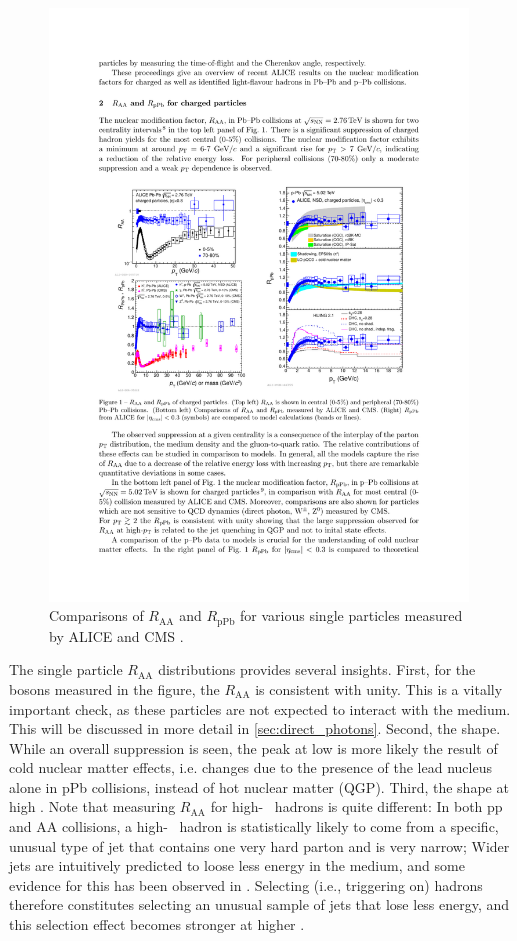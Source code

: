   \begin{figure}[htpb]
    \centering
    \includegraphics[width=0.99\textwidth]{Introduction/alice_hadron_raa.pdf}
    \caption{Comparisons of $R_\mathrm{AA}$ and $R_\mathrm{pPb}$ for various single particles measured by ALICE and CMS \cite{Bencedi2016}.}
    \label{fig:raa_particles}
  \end{figure}

  The single particle $R_\mathrm{AA}$ distributions provides several insights. First, for the bosons measured in the figure, the $R_\mathrm{AA}$ is consistent with unity. This is a vitally important check, as these particles are not expected to interact with the medium. This will be discussed in more detail in \ref{sec:direct_photons}. Second, the shape. While an overall suppression is seen, the peak at low \pt is more likely the result of cold nuclear matter effects, i.e. changes due to the presence of the lead nucleus alone in pPb collisions, instead of hot nuclear matter (QGP). Third, the shape at high \pT. Note that measuring $R_\mathrm{AA}$ for high-\pT~ hadrons is quite different: In both pp and AA collisions, a high-\pT~ hadron is statistically likely to come from a specific, unusual type of jet that contains one very hard parton and is very narrow; Wider jets are intuitively predicted to loose less energy in the medium, and some evidence for this has been observed in \cite{Khachatryan2016}. Selecting (i.e., triggering on) hadrons therefore constitutes selecting an unusual sample of jets that lose less energy, and this selection effect becomes stronger at higher \pT.

